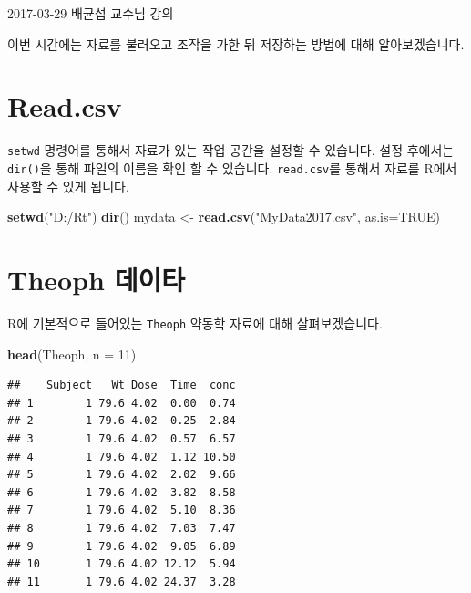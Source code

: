 \documentclass[10pt,]{krantz}
\makeatletter
\newenvironment{Shaded}{\begin{snugshade}}{\end{snugshade}}
\newcommand{\KeywordTok}[1]{\textcolor[rgb]{0.13,0.29,0.53}{\textbf{#1}}}
\newcommand{\DataTypeTok}[1]{\textcolor[rgb]{0.13,0.29,0.53}{#1}}
\newcommand{\DecValTok}[1]{\textcolor[rgb]{0.00,0.00,0.81}{#1}}
\newcommand{\StringTok}[1]{\textcolor[rgb]{0.31,0.60,0.02}{#1}}
\newcommand{\OtherTok}[1]{\textcolor[rgb]{0.56,0.35,0.01}{#1}}
\newcommand{\NormalTok}[1]{#1}
\renewenvironment{quote}{\begin{VF}}{\end{VF}}
\newenvironment{kframe}{%
\medskip{}
\setlength{\fboxsep}{.8em}
 \def\at@end@of@kframe{}%
 \ifinner\ifhmode%
  \def\at@end@of@kframe{\end{minipage}}%
  \begin{minipage}{\columnwidth}%
 \fi\fi%
 \def\FrameCommand##1{\hskip\@totalleftmargin \hskip-\fboxsep
 \colorbox{shadecolor}{##1}\hskip-\fboxsep
     \hskip-\linewidth \hskip-\@totalleftmargin \hskip\columnwidth}%
 \MakeFramed {\advance\hsize-\width
   \@totalleftmargin\z@ \linewidth\hsize
   \@setminipage}}%
 {\par\unskip\endMakeFramed%
 \at@end@of@kframe}
\renewenvironment{Shaded}{\begin{kframe}}{\end{kframe}}
\makeatother
\begin{document}
\begin{quote}
2017-03-29 배균섭 교수님 강의
\end{quote}

이번 시간에는 자료를 불러오고 조작을 가한 뒤 저장하는 방법에 대해
알아보겠습니다.

\section{Read.csv}\label{read.csv}

\texttt{setwd} 명령어를 통해서 자료가 있는 작업 공간을 설정할 수
있습니다. 설정 후에서는 \texttt{dir()}을 통해 파일의 이름을 확인 할 수
있습니다. \texttt{read.csv}를 통해서 자료를 R에서 사용할 수 있게 됩니다.

\begin{Shaded}
\begin{Highlighting}[]
\KeywordTok{setwd}\NormalTok{(}\StringTok{"D:/Rt"}\NormalTok{)}
\KeywordTok{dir}\NormalTok{()}
\NormalTok{mydata <-}\StringTok{ }\KeywordTok{read.csv}\NormalTok{(}\StringTok{"MyData2017.csv"}\NormalTok{, }\DataTypeTok{as.is=}\OtherTok{TRUE}\NormalTok{)}
\end{Highlighting}
\end{Shaded}

\section{Theoph 데이타}\label{theoph-}

R에 기본적으로 들어있는 \texttt{Theoph} 약동학 자료에 대해
살펴보겠습니다.

\begin{Shaded}
\begin{Highlighting}[]
\KeywordTok{head}\NormalTok{(Theoph, }\DataTypeTok{n =} \DecValTok{11}\NormalTok{)}
\end{Highlighting}
\end{Shaded}

\begin{verbatim}
##    Subject   Wt Dose  Time  conc
## 1        1 79.6 4.02  0.00  0.74
## 2        1 79.6 4.02  0.25  2.84
## 3        1 79.6 4.02  0.57  6.57
## 4        1 79.6 4.02  1.12 10.50
## 5        1 79.6 4.02  2.02  9.66
## 6        1 79.6 4.02  3.82  8.58
## 7        1 79.6 4.02  5.10  8.36
## 8        1 79.6 4.02  7.03  7.47
## 9        1 79.6 4.02  9.05  6.89
## 10       1 79.6 4.02 12.12  5.94
## 11       1 79.6 4.02 24.37  3.28
\end{verbatim}
\end{document}
